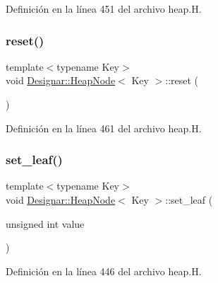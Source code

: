 Definición en la línea 451 del archivo heap.\+H.

\mbox{\label{class_designar_1_1_heap_node_a60340ca59bc0968899e960bc9d1b08b3}} 
\subsubsection{\texorpdfstring{reset()}{reset()}}
{\footnotesize\ttfamily template$<$typename Key$>$ \\
void \hyperlink{class_designar_1_1_heap_node}{Designar\+::\+Heap\+Node}$<$ Key $>$\+::reset (\begin{DoxyParamCaption}{ }\end{DoxyParamCaption})\hspace{0.3cm}{\ttfamily [inline]}}



Definición en la línea 461 del archivo heap.\+H.

\mbox{\label{class_designar_1_1_heap_node_a34ec910a7402b356d7b3d67200f794ec}} 
\subsubsection{\texorpdfstring{set\+\_\+leaf()}{set\_leaf()}}
{\footnotesize\ttfamily template$<$typename Key$>$ \\
void \hyperlink{class_designar_1_1_heap_node}{Designar\+::\+Heap\+Node}$<$ Key $>$\+::set\+\_\+leaf (\begin{DoxyParamCaption}\item[{unsigned int}]{value }\end{DoxyParamCaption})\hspace{0.3cm}{\ttfamily [inline]}}



Definición en la línea 446 del archivo heap.\+H.

\mbox{\label{class_designar_1_1_heap_node_a65a5b3a38d152072e756182600502d93}} 
